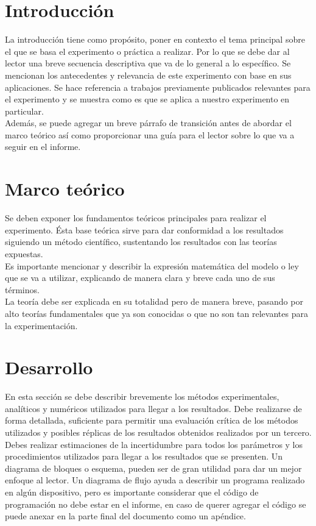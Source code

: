 \documentclass[letterpaper, 11pt]{article}
\begin{document}
\section{Introducción}
La introducción tiene como propósito, poner en contexto el tema principal sobre el que se basa el experimento o práctica a realizar. Por lo que se debe dar al lector una breve secuencia descriptiva que va de lo general a lo específico. Se mencionan los antecedentes y relevancia de este experimento con base en sus aplicaciones. Se hace referencia a trabajos previamente publicados relevantes para el experimento y se muestra como es que se aplica a nuestro  experimento en particular.\\
Además, se puede agregar un breve párrafo de transición antes de abordar el marco teórico así como proporcionar una guía para el lector sobre lo que va a seguir en el informe.

\section{Marco teórico}
Se deben exponer los fundamentos teóricos principales para realizar el experimento. Ésta base teórica sirve para dar conformidad a los resultados siguiendo un método científico, sustentando los resultados con las teorías expuestas.\\
Es importante mencionar y describir la expresión matemática del modelo o ley que se va a utilizar, explicando de manera clara y breve cada uno de sus  términos.\\
La teoría debe ser explicada en su  totalidad pero de manera breve, pasando por alto teorías fundamentales que ya son conocidas o que no son tan relevantes  para la experimentación.

\section{Desarrollo}
En esta sección se debe describir brevemente los métodos experimentales, analíticos y numéricos utilizados para llegar a los resultados. Debe realizarse de forma detallada, suficiente para permitir una evaluación crítica de los métodos utilizados y posibles réplicas de los resultados obtenidos realizados por un tercero. Debes realizar estimaciones de la incertidumbre para todos los parámetros y los procedimientos utilizados para llegar a los resultados que se presenten. Un diagrama de bloques o esquema, pueden ser de gran utilidad para dar un mejor enfoque al lector.  Un diagrama de flujo ayuda a describir un programa realizado en algún dispositivo, pero es importante considerar que el código de programación no debe estar en el informe, en caso de querer agregar el código  se puede anexar  en la parte final del documento como un apéndice.
\end{document}
